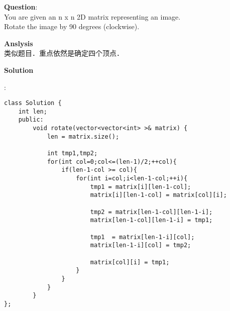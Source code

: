 \begin{description}
    \item{\textbf{Question}}:\\%
		You are given an n x n 2D matrix representing an image.\\
		Rotate the image by 90 degrees (clockwise).\\

    \item{\textbf{Anslysis}}\\
		类似题目．重点依然是确定四个顶点．\\

    \item{\textbf{Solution}}\\
	\item{} : \\
		\begin{lstlisting}
class Solution {
	int len;
	public:
		void rotate(vector<vector<int> >& matrix) {
			len = matrix.size();

			int tmp1,tmp2;
			for(int col=0;col<=(len-1)/2;++col){
				if(len-1-col >= col){
					for(int i=col;i<len-1-col;++i){
						tmp1 = matrix[i][len-1-col];
						matrix[i][len-1-col] = matrix[col][i];

						tmp2 = matrix[len-1-col][len-1-i];
						matrix[len-1-col][len-1-i] = tmp1;

						tmp1  = matrix[len-1-i][col];
						matrix[len-1-i][col] = tmp2;

						matrix[col][i] = tmp1;
					}
				}
			}
		}
};
		\end{lstlisting}
\end{description}

